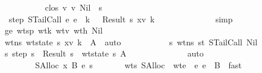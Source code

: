\begin{isabellebody}
\ \ \ \ \ \ \ \ \isamarkupfalse \ {\isacharminus}\isanewline
\ \ \ \ \ \ \ \ \ \ \isamarkupfalse \ clos\ v{}\ v{}\ Nil\ \isamarkupfalse \ s{\isacharcolon}\isanewline
\ \ \ \ \ \ \ \ \ \ \ \ {\isachardoublequoteopen}step\ {\isacharparenleft}STailCall\ e{}\ e{}{\isacharcomma}\ {\isasymrho}{\isacharcomma}\ k{\isacharcomma}\ {\isasymmu}{\isacharcomma}{\isacharbrackleft}{\isacharbrackright}{\isacharparenright}\ {\isacharequal}\ Result\ {\isacharparenleft}s{\isacharprime}{\isacharcomma}\ {\isacharparenleft}x{\isacharcomma}v{}{\isacharparenright}{\isacharhash}{\isasymrho}{\isacharprime}{\isacharcomma}\ k{\isacharcomma}\ {\isasymmu}{\isacharcomma}{\isacharbrackleft}{\isacharbrackright}{\isacharparenright}{\isachardoublequoteclose}\isanewline
\ \ \ \ \ \ \ \ \ \ \ \ \isamarkupfalse \ simp\isanewline
\ \ \ \ \ \ \ \ \ \ \isamarkupfalse \ ge\ wtsp\ wt{\isacharunderscore}k\ wtv{}\ wt{\isacharunderscore}h\ Nil\isanewline
\ \ \ \ \ \ \ \ \ \ \isamarkupfalse \ wtns{\isacharcolon}\ {\isachardoublequoteopen}wt{\isacharunderscore}state\ {\isacharparenleft}s{\isacharprime}{\isacharcomma}\ {\isacharparenleft}x{\isacharcomma}v{}{\isacharparenright}{\isacharhash}{\isasymrho}{\isacharprime}{\isacharcomma}\ k{\isacharcomma}\ {\isasymmu}{\isacharcomma}{\isacharbrackleft}{\isacharbrackright}{\isacharparenright}\ A{\isachardoublequoteclose}\ \isamarkupfalse \ auto\isanewline
\ \ \ \ \ \ \ \ \ \ \isamarkupfalse \ s\ wtns\ st\ STailCall\ Nil\isanewline
\ \ \ \ \ \ \ \ \ \ \isamarkupfalse \ {\isachardoublequoteopen}{\isasymexists}s{\isacharprime}{\isachardot}\ step\ s\ {\isacharequal}\ Result\ s{\isacharprime}\ {\isasymand}\ wt{\isacharunderscore}state\ s{\isacharprime}\ A{\isachardoublequoteclose}\ \isanewline
\ \ \ \ \ \ \ \ \ \ \ \ \isamarkupfalse \ auto\isanewline
\ \ \ \ \ \ \ \ \isamarkupfalse \isanewline
\ \ \ \ \ \ \isamarkupfalse \isanewline
\ \ \ \ \isamarkupfalse \isanewline
\ \ \ \ \ \ \isamarkupfalse \ {\isacharparenleft}SAlloc\ x\ B\ e\ s{\isacharprime}{\isacharparenright}\isanewline
\ \ \ \ \ \ \isamarkupfalse \ wts\ SAlloc\ \isamarkupfalse \ wte{\isacharcolon}\ {\isachardoublequoteopen}{\isasymGamma}\ {\isasymturnstile}\isactrlisub e\ e\ {\isacharcolon}\ B{\isachardoublequoteclose}\ \isamarkupfalse \ fast\isanewline

\end{isabellebody}
